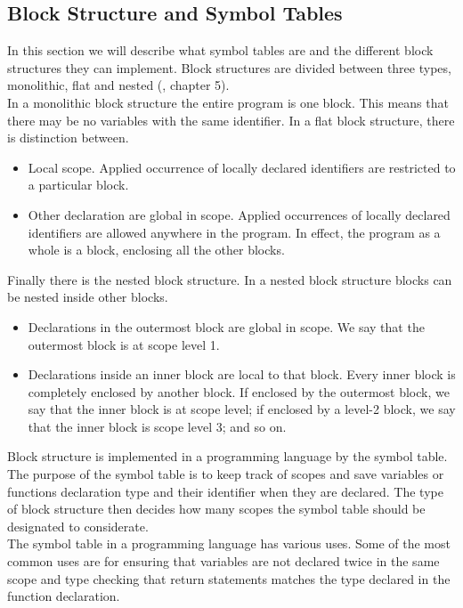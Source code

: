 \subsection{Block Structure and Symbol Tables}\label{Block_Structure_Symbol_Tables}
In this section we will describe what symbol tables are and the different block structures they can implement.
Block structures are divided between three types, monolithic, flat and nested (\cite{compilers-and-intepreters}, chapter 5). \\
In a monolithic block structure the entire program is one block. This means that there may be no variables with the same identifier.
In a flat block structure, there is distinction between.
\begin{itemize}
    \item Local scope. Applied occurrence of locally declared identifiers are restricted to a particular block.
    \item Other declaration are global in scope. Applied occurrences of locally declared identifiers are allowed anywhere in the program. 
    In effect, the program as a whole is a block, enclosing all the other blocks.
\end{itemize}
Finally there is the nested block structure. In a nested block structure blocks can be nested inside other blocks. 
\begin{itemize}
    \item Declarations in the outermost block are global in scope. We say that the outermost block is at scope level 1.
    \item Declarations inside an inner block are local to that block. Every inner block is completely enclosed by another block. If enclosed by the outermost block, we say that the inner block is at scope level; if enclosed by a level-2 block, we say that the inner block is scope level 3; and so on.
\end{itemize}
Block structure is implemented in a programming language by the symbol table. The purpose of the symbol table is to keep track of scopes and save variables or functions declaration type and their identifier when they are declared. The type of block structure then decides how many scopes the symbol table should be designated to considerate.\\
The symbol table in a programming language has various uses. Some of the most common uses are for ensuring that variables are not declared twice in the same scope and type checking that return statements matches the type declared in the function declaration.

